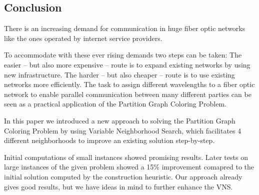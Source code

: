 \documentclass[paper = a4, fontsize = 10pt]{scrartcl}
\begin{document}

\subsection{Conclusion}
There is an increasing demand for communication in huge fiber optic networks like the ones operated by internet service providers.


To accommodate with these ever rising demands two steps can be taken: The easier -- but also more expensive -- route is to expand existing networks by using new infrastructure. The harder -- but also cheaper -- route is to use existing networks more efficiently. The task to assign different wavelengths to a fiber optic network to enable parallel communication between many different parties can be seen as a practical application of the Partition Graph Coloring Problem.


In this paper we introduced a new approach to solving the Partition Graph Coloring Problem by using Variable Neighborhood Search, which facilitates 4 different neighborhoods to improve an existing solution step-by-step.


Initial computations of small instances showed promising results. Later tests on large instances of the given problem showed a 15\% improvement comapred to the initial solution computed by the construction heuristic. Our approach already gives good results, but we have ideas in mind to further enhance the VNS.
\end{document}
